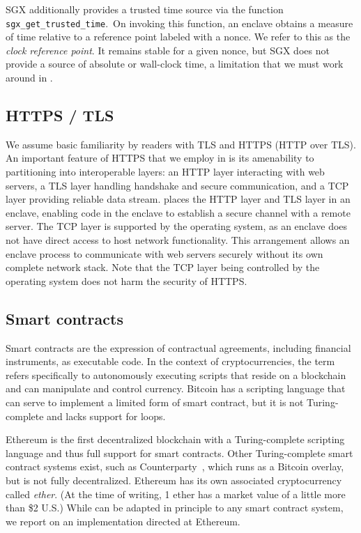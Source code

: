SGX additionally provides a trusted time source via the function \texttt{sgx\_get\_trusted\_time}.~On invoking this function, an enclave obtains a measure of time relative to a reference point labeled with a nonce. We refer to this as the \emph{clock reference point}. It remains stable for a given nonce, but SGX does not provide a source of absolute or wall-clock time, a limitation that we must work around in \tc.

\subsection{HTTPS / TLS}

We assume basic familiarity by readers with TLS and HTTPS (HTTP over TLS). An important feature of HTTPS that we employ in \tc is its amenability to partitioning into interoperable layers: an HTTP layer interacting with web servers, a TLS layer handling handshake and secure communication, and a TCP layer providing reliable data stream. \tc places the HTTP layer and TLS layer in an enclave, enabling code in the enclave to establish a secure channel with a remote server. The TCP layer is supported by the operating system, as an enclave does not have direct access to host network functionality. This arrangement allows an enclave process to communicate with web servers securely without its own complete network stack. Note that the TCP layer being controlled by the operating system does not harm the security of HTTPS.

\subsection{Smart contracts}

Smart contracts are the expression of contractual agreements, including financial instruments, as executable code. In the context of cryptocurrencies, the term refers specifically to autonomously executing scripts that reside on a blockchain and can manipulate and control currency. Bitcoin has a scripting language that can serve to implement a limited form of smart contract, but it is not Turing-complete and lacks support for loops. 

Ethereum is the first decentralized blockchain with a Turing-complete scripting language and thus full support for smart contracts. Other Turing-complete smart contract systems exist, such as Counterparty~\cite{}, which runs as a Bitcoin overlay, but is not fully decentralized. Ethereum has its own associated cryptocurrency called \emph{ether}. (At the time of writing, 1 ether has a market value of a little more than \$2 U.S.) While \tc can be adapted in principle to any smart contract system, we report on an implementation directed at Ethereum.

